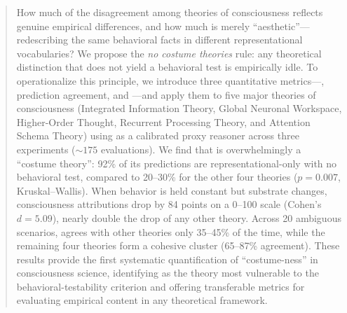 \begin{abstract}
How much of the disagreement among theories of consciousness reflects genuine empirical differences, and how much is merely ``aesthetic''---redescribing the same behavioral facts in different representational vocabularies?
We propose the \emph{no costume theories} rule: any theoretical distinction that does not yield a behavioral test is empirically idle.
To operationalize this principle, we introduce three quantitative metrics---\costumeratio, prediction agreement, and \costumesens---and apply them to five major theories of consciousness (Integrated Information Theory, Global Neuronal Workspace, Higher-Order Thought, Recurrent Processing Theory, and Attention Schema Theory) using \gptmodel as a calibrated proxy reasoner across three experiments (${\sim}175$ evaluations).
We find that \IIT is overwhelmingly a ``costume theory'': 92\% of its predictions are representational-only with no behavioral test, compared to 20--30\% for the other four theories ($p = 0.007$, Kruskal--Wallis).
When behavior is held constant but substrate changes, \IIT consciousness attributions drop by 84 points on a 0--100 scale (Cohen's $d = 5.09$), nearly double the drop of any other theory.
Across 20 ambiguous scenarios, \IIT agrees with other theories only 35--45\% of the time, while the remaining four theories form a cohesive cluster (65--87\% agreement).
These results provide the first systematic quantification of ``costume-ness'' in consciousness science, identifying \IIT as the theory most vulnerable to the behavioral-testability criterion and offering transferable metrics for evaluating empirical content in any theoretical framework.
\end{abstract}

